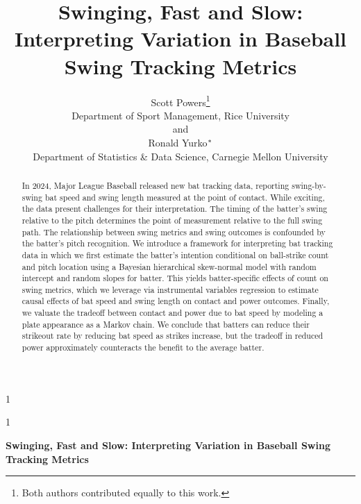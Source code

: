 \documentclass[
  12pt]{article}
\newcommand{\anon}{1}
\begin{document}
\def\spacingset#1{\renewcommand{\baselinestretch}%
{#1}\small\normalsize} \spacingset{1}




\anon
{
  \title{\bf Swinging, Fast and Slow: Interpreting Variation in Baseball Swing Tracking Metrics}
  \author{Scott Powers\thanks{Both authors contributed equally to this work.} \\
    Department of Sport Management, Rice University \\
    and \\
    Ronald Yurko$^{\footnotesize *}$ \\
    Department of Statistics \& Data Science, Carnegie Mellon University
  }
  \maketitle
} \fi

\anon
{
  \bigskip
  \bigskip
  \bigskip
  \begin{center}
    {\LARGE\bf Swinging, Fast and Slow: Interpreting Variation in Baseball Swing Tracking Metrics}
\end{center}
  \medskip
} \fi

\bigskip
\begin{abstract}
  In 2024, Major League Baseball released new bat tracking data, reporting swing-by-swing bat speed and swing length measured at the point of contact. While exciting, the data present challenges for their interpretation. The timing of the batter's swing relative to the pitch determines the point of measurement relative to the full swing path. The relationship between swing metrics and swing outcomes is confounded by the batter's pitch recognition. We introduce a framework for interpreting bat tracking data in which we first estimate the batter's intention conditional on ball-strike count and pitch location using a Bayesian hierarchical skew-normal model with random intercept and random slopes for batter. This yields batter-specific effects of count on swing metrics, which we leverage via instrumental variables regression to estimate causal effects of bat speed and swing length on contact and power outcomes. Finally, we valuate the tradeoff between contact and power due to bat speed by modeling a plate appearance as a Markov chain. We conclude that batters can reduce their strikeout rate by reducing bat speed as strikes increase, but the tradeoff in reduced power approximately counteracts the benefit to the average batter.
\end{abstract}
\end{document}

